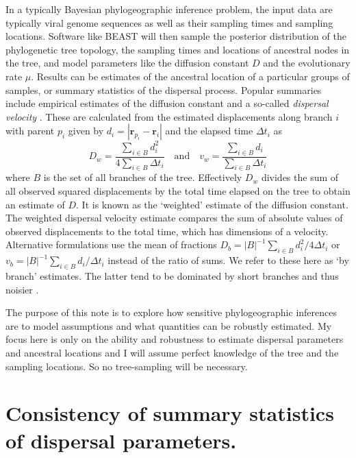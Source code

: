 \documentclass[aps,rmp, twocolumn]{revtex4}
\newcommand{\rvec}{\mathbf{r}}
\begin{document}
In a typically Bayesian phylogeographic inference problem, the input data are typically viral genome sequences as well as their sampling times and sampling locations.
Software like BEAST will then sample the posterior distribution of the phylogenetic tree topology, the sampling times and locations of ancestral nodes in the tree, and model parameters like the diffusion constant $D$ and the evolutionary rate $\mu$.
Results can be estimates of the ancestral location of a particular groups of samples, or summary statistics of the dispersal process.
Popular summaries include empirical estimates of the diffusion constant  \citep{pybus_unifying_2012,trovao_bayesian_2015} and a so-called \emph{dispersal velocity} \citep{dellicour_using_2017}. These are calculated from the estimated displacements along branch $i$ with parent $p_i$ given by $d_i = |\rvec_{p_i} - \rvec_{i}|$ and the elapsed time $\Delta t_i$ as
\begin{equation}
    \label{eq:dispersal_parameters}
    D_w = \frac{\sum_{i\in B}d_i^2}{4\sum_{i\in B} \Delta t_i} \quad \mathrm{and}  \quad v_w = \frac{\sum_{i\in B} d_i}{\sum_{i\in B} \Delta t_i}
\end{equation}
where $B$ is the set of all branches of the tree.
Effectively $D_w$ divides the sum of all observed squared displacements by the total time elapsed on the tree to obtain an estimate of $D$.
It is known as the `weighted' estimate of the diffusion constant.
The weighted dispersal velocity estimate compares the sum of absolute values of observed displacements to the total time, which has dimensions of a velocity.
Alternative formulations use the mean of fractions $D_b = |B|^{-1} \sum_{i\in B}d_i^2/4\Delta t_i$ or $v_b = |B|^{-1} \sum_{i\in B}d_i/\Delta t_i$ instead of the ratio of sums.
We refer to these here as `by branch' estimates.
The latter tend to be dominated by short branches and thus noisier \citep{trovao_bayesian_2015}.

The purpose of this note is to explore how sensitive phylogeographic inferences are to model assumptions and what quantities can be robustly estimated.
My focus here is only on the ability and robustness to estimate dispersal parameters and ancestral locations and I will assume perfect knowledge of the tree and the sampling locations.
So no tree-sampling will be necessary.

\section*{Consistency of summary statistics of dispersal parameters.}
\end{document}
